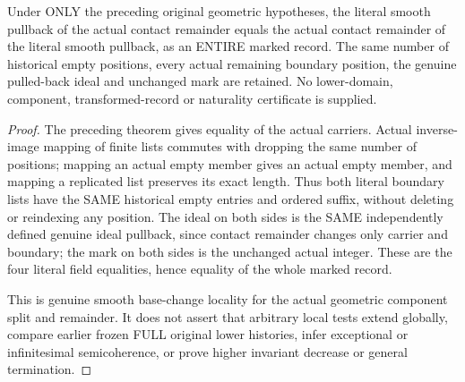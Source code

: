 \begin{theorem}
\label{hir:actual-contact-remainder-whole-marked-smooth-naturality}
\leanok
Under ONLY the preceding original geometric hypotheses, the literal smooth
pullback of the actual contact remainder equals the actual contact
remainder of the literal smooth pullback, as an ENTIRE marked record.
The same number of historical empty positions, every actual remaining
boundary position, the genuine pulled-back ideal and unchanged mark are
retained. No lower-domain, component, transformed-record or naturality
certificate is supplied.
\end{theorem}
\begin{proof}
The preceding theorem gives equality of the actual carriers. Actual
inverse-image mapping of finite lists commutes with dropping the same
number of positions; mapping an actual empty member gives an actual empty
member, and mapping a replicated list preserves its exact length. Thus
both literal boundary lists have the SAME historical empty entries and
ordered suffix, without deleting or reindexing any position. The ideal
on both sides is the SAME independently defined genuine ideal pullback,
since contact remainder changes only carrier and boundary; the mark on
both sides is the unchanged actual integer. These are the four literal
field equalities, hence equality of the whole marked record.

This is genuine smooth base-change locality for the actual geometric
component split and remainder. It does not assert that arbitrary local
tests extend globally, compare earlier frozen FULL original lower
histories, infer exceptional or infinitesimal semicoherence, or prove
higher invariant decrease or general termination.
\end{proof}

